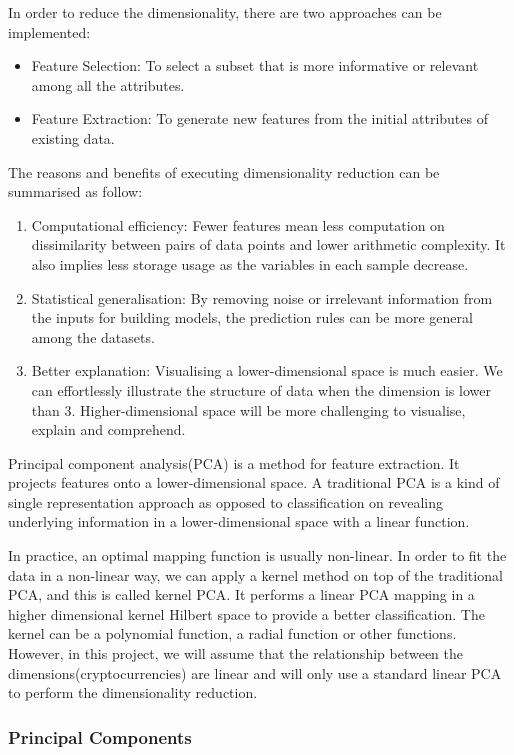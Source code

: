 \documentclass[11pt]{article} %
\theoremstyle{plain}
\theoremstyle{definition}
\begin{document}
In order to reduce the dimensionality, there are two approaches can be implemented:
\begin{itemize}
  \item Feature Selection: To select a subset that is more informative or relevant among all the attributes\cite{hastie/etal:2009}.
  \item Feature Extraction: To generate new features from the initial attributes of existing data\cite{wiki/fe:2018}.
\end{itemize}

The reasons and benefits of executing dimensionality reduction can be summarised as follow:
\begin{enumerate}
  \item Computational efficiency: Fewer features mean less computation on dissimilarity between pairs of data points and lower arithmetic complexity. It also implies less storage usage as the variables in each sample decrease.
  \item Statistical generalisation: By removing noise or irrelevant information from the inputs for building models, the prediction rules can be more general among the datasets.
  \item Better explanation: Visualising a lower-dimensional space is much easier. We can effortlessly illustrate the structure of data when the dimension is lower than 3. Higher-dimensional space will be more challenging to visualise, explain and comprehend.
\end{enumerate}

Principal component analysis(PCA) is a method for feature extraction. It projects features onto a lower-dimensional space. A traditional PCA is a kind of single representation approach as opposed to classification on revealing underlying information in a lower-dimensional space with a linear function. 

In practice, an optimal mapping function is usually non-linear. In order to fit the data in a non-linear way, we can apply a kernel method on top of the traditional PCA, and this is called kernel PCA. It performs a linear PCA mapping in a higher dimensional kernel Hilbert space to provide a better classification. The kernel can be a polynomial function, a radial function or other functions\cite{wiki/kpca:2018}. However, in this project, we will assume that the relationship between the dimensions(cryptocurrencies) are linear and will only use a standard linear PCA to perform the dimensionality reduction.

\subsubsection{Principal Components}
\end{document}
